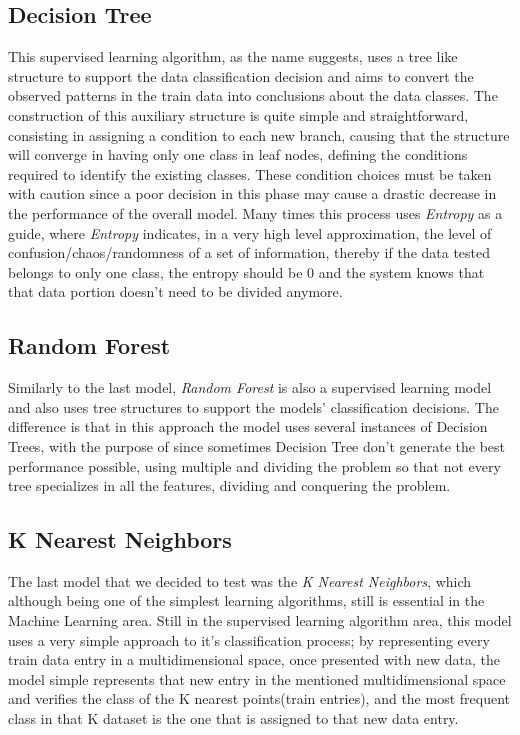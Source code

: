 \documentclass[extendedabs]{recpad2k}
\begin{document}
\subsection{Decision Tree}
This supervised learning algorithm, as the name suggests, uses a tree like structure to support the data classification decision and aims to convert the 
observed patterns in the train data into conclusions about the data classes. The construction of this auxiliary structure is quite simple and straightforward, 
consisting in assigning a condition to each new branch, causing that the structure will converge in having only one class in leaf nodes, defining the conditions 
required to identify the existing classes. These condition choices must be taken with caution since a poor decision in this phase may cause a drastic decrease 
in the performance of the overall model. Many times this process uses \textit{Entropy} as a guide, where \textit{Entropy} indicates, in a very high level 
approximation, the level of confusion/chaos/randomness of a set of information, thereby if the data tested belongs to only one class, the entropy should be 0 
and the system knows that that data portion doesn't need to be divided anymore.

\subsection{Random Forest}
Similarly to the last model, \textit{Random Forest} is also a supervised learning model and also uses tree structures to support the models' classification 
decisions. The difference is that in this approach the model uses several instances of Decision Trees, with the purpose of since sometimes Decision Tree don't 
generate the best performance possible, using multiple and dividing the problem so that not every tree specializes in all the features, dividing and conquering 
the problem.

\subsection{K Nearest Neighbors}
The last model that we decided to test was the \textit{K Nearest Neighbors}, which although being one of the simplest learning algorithms, still is essential 
in the Machine Learning area. Still in the supervised learning algorithm area, this model uses a very simple approach to it's classification process; by 
representing every train data entry in a multidimensional space, once presented with new data, the model simple represents that new entry in the mentioned 
multidimensional space and verifies the class of the K nearest points(train entries), and the most frequent class in that K dataset is the one that is assigned 
to that new data entry. 
\end{document}
